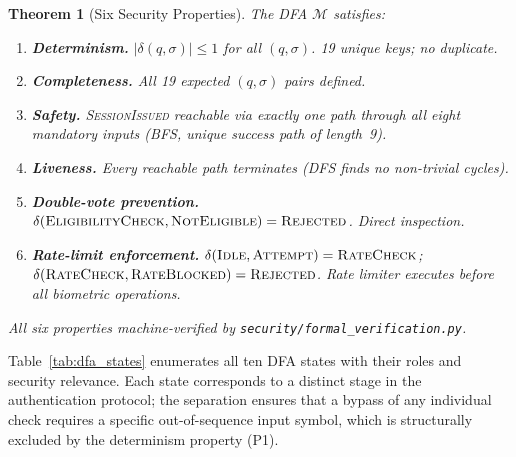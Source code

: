 \documentclass[pdflatex,sn-mathphys-num]{sn-jnl}%
\theoremstyle{thmstyleone}%
\newtheorem{theorem}{Theorem}%
\theoremstyle{thmstyletwo}%
\theoremstyle{thmstylethree}%
\begin{document}
\begin{theorem}[Six Security Properties]
The DFA \(\mathcal{M}\) satisfies:
\begin{enumerate}[label=\textbf{P\arabic*.},leftmargin=*]
  \item \textbf{Determinism.} \(|\delta(q,\sigma)| \leq 1\) for all
    \((q,\sigma)\). \textit{19 unique keys; no duplicate.}
  \item \textbf{Completeness.} All 19 expected \((q,\sigma)\) pairs defined.
  \item \textbf{Safety.} \textsc{SessionIssued} reachable via exactly one
    path through all eight mandatory inputs (BFS, unique success path of
    length~9).
  \item \textbf{Liveness.} Every reachable path terminates (DFS finds no
    non-trivial cycles).
  \item \textbf{Double-vote prevention.}
    \(\delta(\textsc{EligibilityCheck}, \textsc{NotEligible}) =
    \textsc{Rejected}\). Direct inspection.
  \item \textbf{Rate-limit enforcement.}
    \(\delta(\textsc{Idle}, \textsc{Attempt}) = \textsc{RateCheck}\);
    \(\delta(\textsc{RateCheck}, \textsc{RateBlocked}) = \textsc{Rejected}\).
    Rate limiter executes before all biometric operations.
\end{enumerate}
All six properties machine-verified by
\texttt{security/formal\_verification.py}.
\end{theorem}

Table~\ref{tab:dfa_states} enumerates all ten DFA states with their roles and
security relevance. Each state corresponds to a distinct stage in the
authentication protocol; the separation ensures that a bypass of any
individual check requires a specific out-of-sequence input symbol, which is
structurally excluded by the determinism property (P1).
\end{document}
